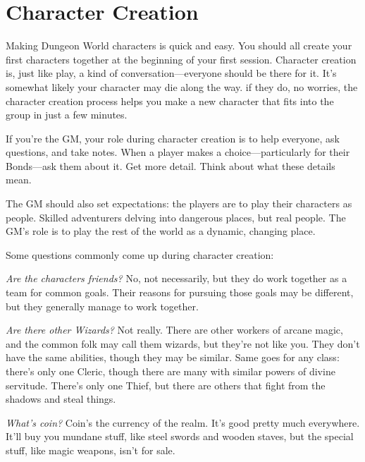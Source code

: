 \chapter{Character Creation}
   
            

Making Dungeon World characters is quick and easy. You should all create your first characters together at the beginning of your first session. Character creation is, just like play, a kind of conversation—everyone should be there for it. It's somewhat likely your character may die along the way. if they do, no worries, the character creation process helps you make a new character that fits into the group in just a few minutes.

       

If you're the GM, your role during character creation is to help everyone, ask questions, and take notes. When a player makes a choice—particularly for their Bonds—ask them about it. Get more detail. Think about what these details mean.

       

The GM should also set expectations: the players are to play their characters as people. Skilled adventurers delving into dangerous places, but real people. The GM's role is to play the rest of the world as a dynamic, changing place.

       

Some questions commonly come up during character creation:

       

         {\em Are the characters friends?}  No, not necessarily, but they do work together as a team for common goals. Their reasons for pursuing those goals may be different, but they generally manage to work together.

       

         {\em Are there other Wizards?}  Not really. There are other workers of arcane magic, and the common folk may call them wizards, but they're not like you. They don't have the same abilities, though they may be similar. Same goes for any class: there's only one Cleric, though there are many with similar powers of divine servitude. There's only one Thief, but there are others that fight from the shadows and steal things.

       

         {\em What's coin?}  Coin's the currency of the realm. It's good pretty much everywhere. It'll buy you mundane stuff, like steel swords and wooden staves, but the special stuff, like magic weapons, isn't for sale.

